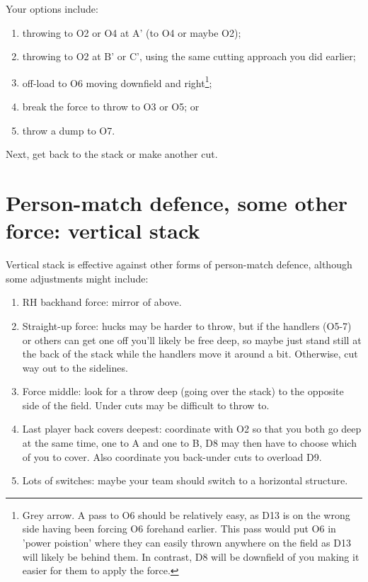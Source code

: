 \documentclass{tufte-handout}
\begin{document}
Your options include:
\begin{enumerate}
\item throwing to O2 or O4 at A'
(to O4 or maybe O2);
\item throwing to O2 at B' or C', 
using the same cutting approach
you did earlier;
\item off-load to O6 
moving downfield and right\footnote{
Grey arrow. 
A pass to O6 
should be relatively easy, 
as D13 is on the wrong side having been forcing O6 forehand earlier.   
This pass would put O6
in 'power poistion'
where they can easily 
thrown anywhere on the field 
as D13 will likely be behind them. 
In contrast, D8 
will be downfield 
of you
making it easier for them to 
apply the force.};
\item break the force 
to throw to O3 
or O5; or 
\item
throw a dump to O7.
\end{enumerate}
Next, get back to the stack
or make another cut.


\section{Person-match defence, some other force: vertical stack}

Vertical stack is effective
 against other forms of person-match defence, 
although some adjustments might include:
\begin{enumerate} 
\item RH backhand force: mirror of above.
\item Straight-up force: 
hucks may be  harder to throw, 
but if the handlers (O5-7) 
or others 
can get one off 
you’ll likely be free deep, 
so maybe just stand still 
at the back of the stack 
while the handlers move it around a bit. 
Otherwise, 
cut way out to the sidelines.
\item Force middle: 
look for a throw deep 
(going over the stack) 
to the opposite side of the field. 
Under cuts may be difficult to throw to. 
\item Last player back covers deepest: 
coordinate with O2 
so that you both go deep at the same time, 
one to A and 
one to B, 
D8 may then have to choose 
which of you to cover.  
Also coordinate you back-under cuts
 to overload D9. 
\item Lots of switches: 
maybe your team 
should switch
 to a horizontal structure. 
\end{enumerate}
\end{document}
